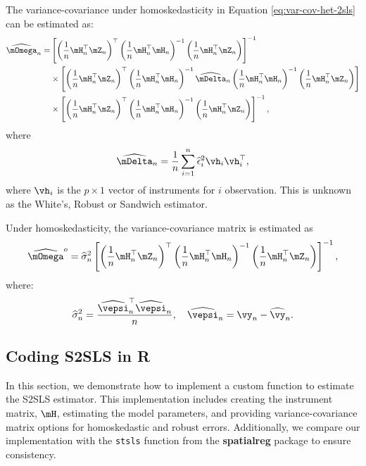 \documentclass[english,12pt]{book}\usepackage[]{graphicx}\usepackage[]{xcolor}
\begin{document}
The variance-covariance under homoskedasticity in Equation \eqref{eq:var-cov-het-2sls} can be estimated as:
\begin{equation}\label{eq:v-s2sls-hetero}
\begin{aligned}
\widehat{\mOmega}_n = &  \left[\left(\frac{1}{n}\mH_n^\top\mZ_n\right)^\top\left(\frac{1}{n}\mH_n^\top\mH_n\right)^{-1}\left(\frac{1}{n}\mH_n^\top\mZ_n\right)\right]^{-1} \\
 & \times \left[\left(\frac{1}{n}\mH_n^\top\mZ_n\right)^\top\left(\frac{1}{n}\mH_n^\top\mH_n\right)^{-1}\widehat{\mDelta}_n\left(\frac{1}{n}\mH_n^\top\mH_n\right)^{-1}\left(\frac{1}{n}\mH_n^\top\mZ_n\right)\right] \\
 & \times \left[\left(\frac{1}{n}\mH_n^\top\mZ_n\right)^\top\left(\frac{1}{n}\mH_n^\top\mH_n\right)^{-1}\left(\frac{1}{n}\mH_n^\top\mZ_n\right)\right]^{-1},
\end{aligned}
\end{equation}
%
where 
\begin{equation}\label{eq:2sls-delta-hat}
\widehat{\mDelta}_n = \frac{1}{n}\sum_{i = 1}^n\widehat{\epsilon}_i^2\vh_i\vh_i^\top, 
\end{equation}
%
where $\vh_i$ is the $p\times 1$ vector of instruments for $i$ observation. This is unknown as the White's, Robust or Sandwich estimator. 

Under homoskedasticity, the variance-covariance matrix is estimated as
\begin{equation}\label{eq:v-s2sls-homo}
\widehat{\mOmega}^o = \widehat{\sigma}^2_{n}\left[\left(\frac{1}{n}\mH_n^\top\mZ_n\right)^\top\left(\frac{1}{n}\mH_n^\top\mH_n\right)^{-1}\left(\frac{1}{n}\mH_n^\top\mZ_n\right)\right]^{-1},
\end{equation}
%
where:
\begin{equation}\label{eq:2sls-sigma-hat}
  \widehat{\sigma}^2_n = \frac{\widehat{\vepsi}_n^\top\widehat{\vepsi}_n}{n},\quad \widehat{\vepsi}_n = \vy_n - \widehat{\vy}_n.
\end{equation}

\subsection{Coding S2SLS in R}

In this section, we demonstrate how to implement a custom function to estimate the S2SLS estimator. This implementation includes creating the instrument matrix, $\mH$, estimating the model parameters, and providing variance-covariance matrix options for homoskedastic and robust errors. Additionally, we compare our implementation with the \texttt{stsls} function from the \textbf{spatialreg} package \citep{spatialregcit} to ensure consistency.
\end{document}
